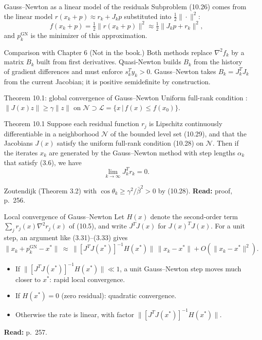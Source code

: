 \documentclass[aspectratio=169,12pt]{beamer}
\newcommand{\xs}{x^{*}}
\newcommand{\hessf}{\nabla^{2} f}
\newcommand{\Lcal}{\mathcal{L}}
\newcommand{\Ncal}{\mathcal{N}}
\newcommand{\GN}{\mathrm{GN}}
\newcommand{\eqn}[1]{\text{\small(#1)}}
\newcommand{\readbook}[1]{{\color{red}\textbf{Read:} #1}}
\newcommand{\notinbook}{{\small(Not in the book.)}}
\begin{document}
\begin{frame}{Gauss--Newton as a linear model of the residuals}
  Subproblem (10.26) comes from the linear model $r(x_{k}+p)\approx r_{k}+J_{k}p$ substituted
  into $\tfrac12\|\cdot\|^{2}$:
  \[ f(x_{k}+p)=\tfrac12\|r(x_{k}+p)\|^{2}\approx\tfrac12\|J_{k}p+r_{k}\|^{2} , \]
  and $p_{k}^{\GN}$ is the minimizer of this approximation.

  \vspace{0.6em}
  \begin{block}{Comparison with Chapter 6 \notinbook}
    Both methods replace $\hessf_{k}$ by a matrix $B_{k}$ built from first derivatives.
    Quasi-Newton builds $B_{k}$ from the history of gradient differences and must enforce
    $s_{k}^{T}y_{k}>0$. Gauss--Newton takes $B_{k}=J_{k}^{T}J_{k}$ from the current Jacobian;
    it is positive semidefinite by construction.
  \end{block}
\end{frame}

\begin{frame}{Theorem 10.1: global convergence of Gauss--Newton}
  Uniform full-rank condition \eqn{10.28}: $\|J(x)z\|\ge\gamma\|z\|$ on $\Ncal\supset\Lcal=\{x\,|\,f(x)\le f(x_{0})\}$.

  \begin{block}{Theorem 10.1}
    Suppose each residual function $r_{j}$ is Lipschitz continuously differentiable in a
    neighborhood $\Ncal$ of the bounded level set (10.29), and that the Jacobians $J(x)$ satisfy the
    uniform full-rank condition (10.28) on $\Ncal$. Then if the iterates $x_{k}$ are generated by the
    Gauss--Newton method with step lengths $\alpha_{k}$ that satisfy (3.6), we have
    \[ \lim_{k\to\infty}J_{k}^{T}r_{k}=0 . \]
  \end{block}

  Zoutendijk (Theorem 3.2) with $\cos\theta_{k}\ge\gamma^{2}/\bar\beta^{2}>0$ by (10.28). \readbook{proof, p.~256.}
\end{frame}

\begin{frame}{Local convergence of Gauss--Newton}
  Let $H(x)$ denote the second-order term $\sum_{j}r_{j}(x)\nabla^{2}r_{j}(x)$ of (10.5), and
  write $J^{T}J(x)$ for $J(x)^{T}J(x)$. For a unit step, an argument like (3.31)--(3.33) gives
  \[
    \|x_{k}+p_{k}^{\GN}-\xs\|\ \approx\ \big\|[J^{T}J(\xs)]^{-1}H(\xs)\big\|\,\|x_{k}-\xs\|+O(\|x_{k}-\xs\|^{2}) .
    \tag{10.30}
  \]
  \begin{itemize}\setlength\itemsep{0.5em}
    \item If $\|[J^{T}J(\xs)]^{-1}H(\xs)\|\ll 1$, a unit Gauss--Newton step moves much closer to $\xs$:
      rapid local convergence.
    \item If $H(\xs)=0$ (zero residual): quadratic convergence.
    \item Otherwise the rate is linear, with factor $\|[J^{T}J(\xs)]^{-1}H(\xs)\|$.
  \end{itemize}
  \readbook{p.~257.}
\end{frame}
\end{document}
